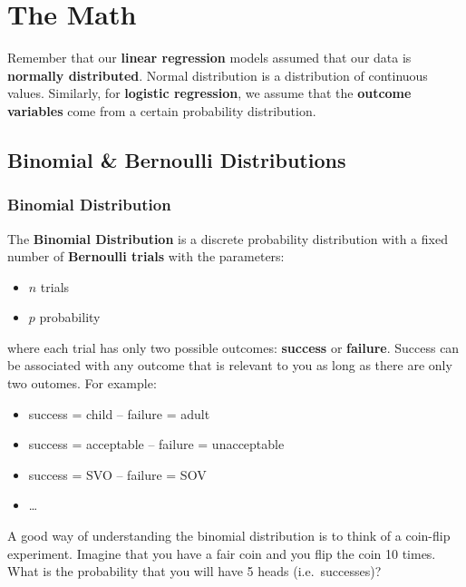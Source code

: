 \documentclass[
]{book}
\providecommand{\tightlist}{%
  \setlength{\itemsep}{0pt}\setlength{\parskip}{0pt}}
\begin{document}
\section{The Math}\label{the-math}

Remember that our \textbf{linear regression} models assumed that our data is \textbf{normally distributed}. Normal distribution is a distribution of continuous values. Similarly, for \textbf{logistic regression}, we assume that the \textbf{outcome variables} come from a certain probability distribution.

\subsection{Binomial \& Bernoulli Distributions}\label{binomial-bernoulli-distributions}

\subsubsection{Binomial Distribution}\label{binomial-distribution}

The \textbf{Binomial Distribution} is a discrete probability distribution with a fixed number of \textbf{Bernoulli trials} with the parameters:

\begin{itemize}
\tightlist
\item
  \(n\) trials
\item
  \(p\) probability
\end{itemize}

where each trial has only two possible outcomes: \textbf{success} or \textbf{failure}. Success can be associated with any outcome that is relevant to you as long as there are only two outomes. For example:

\begin{itemize}
\tightlist
\item
  success = child -- failure = adult
\item
  success = acceptable -- failure = unacceptable
\item
  success = SVO -- failure = SOV
\item
  \ldots{}
\end{itemize}

A good way of understanding the binomial distribution is to think of a coin-flip experiment. Imagine that you have a fair coin and you flip the coin 10 times. What is the probability that you will have 5 heads (i.e.~successes)?
\end{document}
